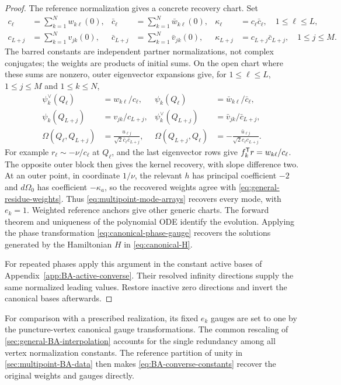 \begin{proof}
The reference normalization gives a concrete recovery chart. Set
\begin{equation}\label{eq:BA-converse-constants}
\begin{aligned}
 c_{\ell}&=\sum_{k=1}^{N}w_{k\ell}(0),&
 \bar c_{\ell}&=\sum_{k=1}^{N}\bar w_{k\ell}(0),&
 \kappa_{\ell}&=c_{\ell}\bar c_{\ell},\quad1\leq\ell\leq L,\\
 c_{L+j}&=\sum_{k=1}^{N}v_{jk}(0),&
 \bar c_{L+j}&=\sum_{k=1}^{N}\bar v_{jk}(0),&
 \kappa_{L+j}&=c_{L+j}\bar c_{L+j},\quad1\leq j\leq M.
\end{aligned}
\end{equation}
The barred constants are independent partner normalizations, not
complex conjugates; the weights are products of initial sums.
On the open chart where these sums are nonzero, outer eigenvector
expansions give, for $1\leq\ell\leq L$, $1\leq j\leq M$ and $1\leq k\leq N$,
\begin{equation}\label{eq:BA-converse-recovery}
\begin{aligned}
 \psi_k^\vee(Q_{\ell})&=w_{k\ell}/c_{\ell},&
 \psi_k(Q_{\ell})&=\bar w_{k\ell}/\bar c_{\ell},\\
 \psi_k(Q_{L+j})&=v_{jk}/c_{L+j},&
 \psi_k^\vee(Q_{L+j})&=\bar v_{jk}/\bar c_{L+j},\\
 \Omega(Q_{\ell},Q_{L+j})&=\frac{u_{\ell j}}{\sqrt2\bar c_{\ell}\bar c_{L+j}},&
 \Omega(Q_{L+j},Q_{\ell})&=-\frac{\bar u_{\ell j}}{\sqrt2c_{\ell}c_{L+j}}.
\end{aligned}
\end{equation}
For example $r_{\ell}\sim-\nu/c_{\ell}$ at $Q_{\ell}$, and the last eigenvector
rows give $f_k^{\mathsf T}r=w_{k\ell}/c_{\ell}$. The opposite outer block then
gives the kernel recovery, with slope difference two. At an outer
point, in coordinate $1/\nu$, the relevant $h$ has principal
coefficient $-2$ and $d\Omega_0$ has coefficient $-\kappa_a$, so
the recovered weights agree with \cref{eq:general-residue-weights}.
Thus \cref{eq:multipoint-mode-arrays} recovers every mode, with
$e_k=1$. Weighted reference anchors give other generic charts.
The forward theorem and uniqueness of the polynomial ODE identify
the evolution. Applying the phase transformation
\cref{eq:canonical-phase-gauge} recovers the solutions generated by
the Hamiltonian $H$ in \cref{eq:canonical-H}.

For repeated phases apply this argument in the constant active bases
of Appendix~\ref{app:BA-active-converse}. Their resolved infinity
directions supply the same normalized leading values. Restore
inactive zero directions and invert the canonical bases afterwards.
\end{proof}

For comparison with a prescribed realization, its fixed $e_k$ gauges
are set to one by the puncture-vertex canonical gauge transformations.
The common rescaling of \cref{sec:general-BA-interpolation} accounts
for the single redundancy among all vertex normalization constants.
The reference partition of unity in \cref{sec:multipoint-BA-data}
then makes \cref{eq:BA-converse-constants} recover the original
weights and gauges directly.
